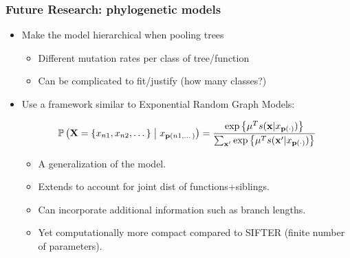 \documentclass[aspectratio=169, 9pt]{beamer}\usepackage[]{graphicx}\usepackage[]{color}
\begin{document}
\begin{frame}
\frametitle{Future Research: phylogenetic models}

\begin{itemize}
\item Make the model hierarchical when pooling trees\pause
\begin{itemize}
\item Different mutation rates per class of tree/function
\item Can be complicated to fit/justify (how many classes?)
\end{itemize}\pause
\item Use a framework similar to Exponential Random Graph Models:\pause

$$
\Prcond{\Ann=\{\ann{n1}, \ann{n2},\dots\}}{\ann{\parent{n1, \dots}}} = \frac{\exp{\mu^{T} s(\mathbf{x}|\ann{\parent{\cdot}})}}{\sum_{\mathbf{x}'}\exp{\mu^{T} s(\mathbf{x}'|\ann{\parent{\cdot}})}}
$$

\begin{itemize}
\item A generalization of the model.
\item Extends to account for joint dist of functions+siblings.
\item Can incorporate additional information such as branch lengths.
\item Yet computationally more compact compared to SIFTER (finite number of parameters).
\end{itemize}
\end{itemize}


\end{frame}
\end{document}
